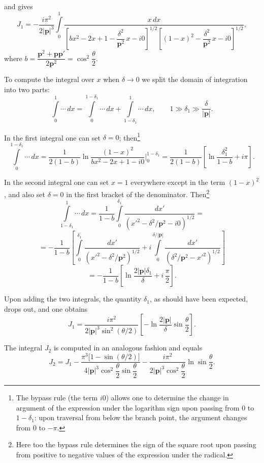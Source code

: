 
\noindent and gives
\[
J_1 = -\frac{i\pi^2}{2|\mathbf{p}|^3}\int\limits_0^1 \frac{x\,dx}{\left[bx^2 - 2x + 1 - \dfrac{\delta^2}{\mathbf{p}^2}\,x - i0\right]^{1/2}\left[(1 - x)^2 - \dfrac{\delta^2}{\mathbf{p}^2}\,x - i0\right]^{1/2}},
\]
where $b = \dfrac{\mathbf{p}^2 + \mathbf{p}\mathbf{p}'}{2\mathbf{p}^2} = \cos^2\dfrac{\theta}{2}$.

To compute the integral over $x$ when $\delta \to 0$ we split the domain of integration into two parts:
\[
\int\limits_0^1 \cdots\,dx = \int\limits_0^{1-\delta_1} \cdots\,dx + \int\limits_{1-\delta_1}^1 \cdots\,dx, \qquad 1 \gg \delta_1 \gg \frac{\delta}{|\mathbf{p}|}.
\]

In the first integral one can set $\delta = 0$; then\footnote{The bypass rule (the term $i0$) allows one to determine the change in argument of the expression under the logarithm sign upon passing from $0$ to $1 - \delta_1$: upon traversal from below the branch point, the argument changes from $0$ to $-\pi$.}
\[
\int\limits_0^{1-\delta_1} \cdots\,dx = \frac{1}{2(1-b)}\ln\frac{(1-x)^2}{bx^2 - 2x + 1 - i0}\bigg|_0^{1-\delta_1} = \frac{1}{2(1-b)}\left[\ln\frac{\delta_1^2}{1-b} + i\pi\right].
\]

In the second integral one can set $x = 1$ everywhere except in the term $(1 - x)^2$, and also set $\delta = 0$ in the first bracket of the denominator. Then\footnote{Here too the bypass rule determines the sign of the square root upon passing from positive to negative values of the expression under the radical.}
\[
\int\limits_{1-\delta_1}^1 \cdots\,dx = \frac{1}{1-b}\int\limits_0^{\delta_1}\frac{dx'}{\left(x'^2 - \delta^2/\mathbf{p}^2 - i0\right)^{1/2}} =
\]
\[
= -\frac{1}{1-b}\left[\int\limits_0^{\delta_1}\frac{dx'}{\left(x'^2 - \delta^2/\mathbf{p}^2\right)^{1/2}} + i\int\limits_0^{\delta/|\mathbf{p}|}\frac{dx'}{\left(\delta^2/\mathbf{p}^2 - x'^2\right)^{1/2}}\right]
\]
\[
= -\frac{1}{1-b}\left[\ln\frac{2|\mathbf{p}|\delta_1}{\delta} + i\,\frac{\pi}{2}\right].
\]

Upon adding the two integrals, the quantity $\delta_1$, as should have been expected, drops out, and one obtains
\begin{equation}
J_1 = \frac{i\pi^2}{2|\mathbf{p}|^3\sin^2(\theta/2)}\left[-\ln\frac{2|\mathbf{p}|}{\delta}\sin\frac{\theta}{2}\right].
\label{eq:121.16}
\end{equation}


The integral $J_2$ is computed in an analogous fashion and equals
\begin{equation}
J_2 = J_1 - \frac{\pi^3\bigl[1 - \sin(\theta/2)\bigr]}{4|\mathbf{p}|^3\cos^2\dfrac{\theta}{2}\sin\dfrac{\theta}{2}} - \frac{i\pi^2}{2|\mathbf{p}|^3\cos^2\dfrac{\theta}{2}}\ln\sin\frac{\theta}{2}.
\label{eq:121.17}
\end{equation}


